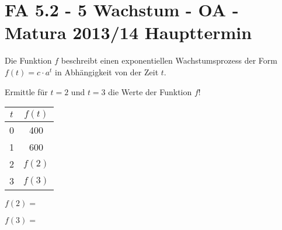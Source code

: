 \section{FA 5.2 - 5 Wachstum - OA - Matura 2013/14 Haupttermin}

\begin{beispiel}{1} %
			Die Funktion $f$ beschreibt einen exponentiellen Wachstumsprozess der Form $f(t)=c\cdot a^t$ in Abhängigkeit von der Zeit $t$.
			
			Ermittle für $t=2$ und $t=3$ die Werte der Funktion $f$!
			
			\begin{center}
			\begin{tabular}{|c|c|}\hline
			$t$&$f(t)$\\ \hline
			0&400\\ \hline
			1&600\\ \hline
			2&$f(2)$\\ \hline
			3&$f(3)$\\ \hline			
			\end{tabular}
			\end{center}
			
			$f(2)=$ \leer
			
			$f(3)=$ 
\end{beispiel}